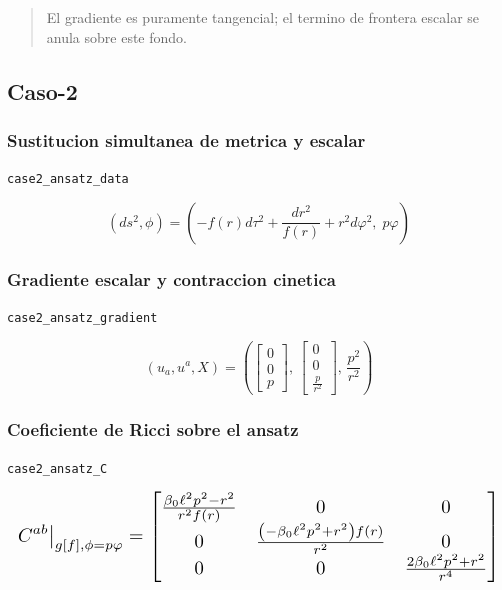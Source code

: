 \documentclass[11pt,a4paper]{article}
\begin{document}
\begin{quote}\small El gradiente es puramente tangencial; el termino de frontera escalar se anula sobre este fondo.\end{quote}

\subsection{Caso-2}

\subsubsection{Sustitucion simultanea de metrica y escalar}

\noindent\texttt{case2\_ansatz\_data}\par\nopagebreak[4]

\[
(ds^2,\phi) = \left(-f(r)d\tau^2+\frac{dr^2}{f(r)}+r^2d\varphi^2,\;p\varphi\right)
\]

\subsubsection{Gradiente escalar y contraccion cinetica}

\noindent\texttt{case2\_ansatz\_gradient}\par\nopagebreak[4]

\[
(u_a,u^a,X) = \left(\left[\begin{matrix}0\\0\\p\end{matrix}\right],\,\left[\begin{matrix}0\\0\\\frac{p}{r^{2}}\end{matrix}\right],\,\frac{p^{2}}{r^{2}}\right)
\]

\subsubsection{Coeficiente de Ricci sobre el ansatz}

\noindent\texttt{case2\_ansatz\_C}\par\nopagebreak[4]

\[
\resizebox{\textwidth}{!}{$\displaystyle C^{ab}\big|_{g[f],\phi=p\varphi} = \left[\begin{matrix}\frac{\beta_{0} \ell^{2} p^{2} - r^{2}}{r^{2} f{\left(r \right)}} & 0 & 0\\0 & \frac{\left(- \beta_{0} \ell^{2} p^{2} + r^{2}\right) f{\left(r \right)}}{r^{2}} & 0\\0 & 0 & \frac{2 \beta_{0} \ell^{2} p^{2} + r^{2}}{r^{4}}\end{matrix}\right]$}
\]
\end{document}
